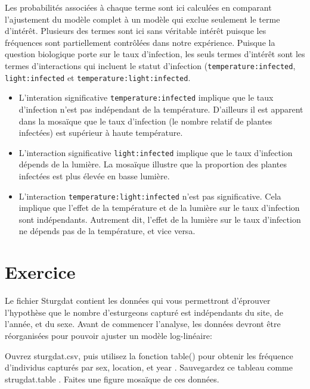 \documentclass[
  12pt,
]{book}
\makeatletter
\providecommand{\tightlist}{%
  \setlength{\itemsep}{0pt}\setlength{\parskip}{0pt}}
\newenvironment{kframe}{%
\medskip{}
\setlength{\fboxsep}{.8em}
\def\at@end@of@kframe{}%
\ifinner\ifhmode%
 \def\at@end@of@kframe{\end{minipage}}%
 \begin{minipage}{\columnwidth}%
\fi\fi%
\def\FrameCommand##1{\hskip\@totalleftmargin \hskip-\fboxsep
\colorbox{incolor}{##1}\hskip-\fboxsep
    \hskip-\linewidth \hskip-\@totalleftmargin \hskip\columnwidth}%
\MakeFramed {\advance\hsize-\width
  \@totalleftmargin\z@ \linewidth\hsize
  \@setminipage}}%
{\par\unskip\endMakeFramed%
\at@end@of@kframe}
\newenvironment{rmdblock}[1]
 {
 \begin{itemize}
 \renewcommand{\labelitemi}{
   \raisebox{-.7\height}[0pt][0pt]{
     {\setkeys{Gin}{width=3em,keepaspectratio}\texttt{[image: images/\#1]}}
   }
 }
 \begin{kframe}
 \setlength{\fboxsep}{1em}
 \item
 }
 {
 \end{kframe}
 \end{itemize}
 }
\newenvironment{rmdcode}
  {\begin{rmdblock}{screen}}
  {\end{rmdblock}}
\makeatother
\begin{document}
Les probabilités associées à chaque terme sont ici calculées en comparant l'ajustement du modèle complet à un modèle qui exclue seulement le terme d'intérêt. Plusieurs des termes sont ici sans véritable intérêt puisque les fréquences sont partiellement contrôlées dans notre expérience. Puisque la question biologique porte sur le taux d'infection, les seuls termes d'intérêt sont les termes d'interactions qui incluent le statut d'infection (\texttt{temperature:infected}, \texttt{light:infected} et \texttt{temperature:light:infected}.

\begin{itemize}
\tightlist
\item
  L'interation significative \texttt{temperature:infected} implique que le taux d'infection n'est pas indépendant de la température. D'ailleurs il est apparent dans la mosaïque que le taux d'infection (le nombre relatif de plantes infectées) est supérieur à haute température.
\item
  L'interaction significative \texttt{light:infected} implique que le taux d'infection dépends de la lumière. La mosaïque illustre que la proportion des plantes infectées est plus élevée en basse lumière.
\item
  L'interaction \texttt{temperature:light:infected} n'est pas significative. Cela implique que l'effet de la température et de la lumière sur le taux d'infection sont indépendants. Autrement dit, l'effet de la lumière sur le taux d'infection ne dépends pas de la température, et vice versa.
\end{itemize}

\hypertarget{ex-glm}{%
\section{Exercice}\label{ex-glm}}

Le fichier Sturgdat contient les données qui vous permettront d'éprouver l'hypothèse que le nombre d'esturgeons capturé est indépendants du site, de l'année, et du sexe. Avant de commencer l'analyse, les données devront être réorganisées pour pouvoir ajuster un modèle log-linéaire:

\begin{rmdcode}
Ouvrez sturgdat.csv, puis utilisez la fonction table() pour obtenir les fréquence d'individus capturés par sex, location, et year . Sauvegardez ce tableau comme strugdat.table . Faites une figure mosaïque de ces données.
\end{rmdcode}
\end{document}

